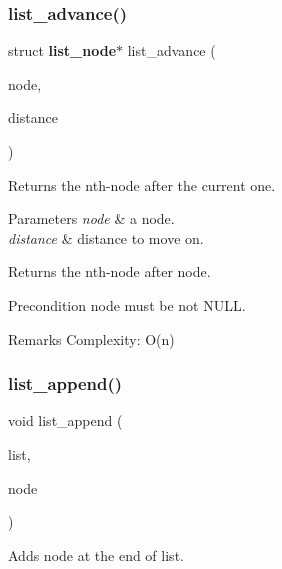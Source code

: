 \subsubsection{list\+\_\+advance()}
{\footnotesize\ttfamily struct \textbf{ list\+\_\+node}$\ast$ list\+\_\+advance (\begin{DoxyParamCaption}\item[{struct \textbf{ list\+\_\+node} $\ast$}]{node,  }\item[{size\+\_\+t}]{distance }\end{DoxyParamCaption})}

Returns the nth-\/node after the current one.


\begin{DoxyParams}{Parameters}
{\em node} & a node. \\
\hline
{\em distance} & distance to move on. \\
\hline
\end{DoxyParams}
\begin{DoxyReturn}{Returns}
the nth-\/node after {\ttfamily node}.
\end{DoxyReturn}
\begin{DoxyPrecond}{Precondition}
{\ttfamily node} must be not N\+U\+LL.
\end{DoxyPrecond}
\begin{DoxyRemark}{Remarks}
Complexity\+: O(n) 
\end{DoxyRemark}
\mbox{\label{list_8c_a40638777b5f341c88e8b09acf75fb8c9}} 
\subsubsection{list\+\_\+append()}
{\footnotesize\ttfamily void list\+\_\+append (\begin{DoxyParamCaption}\item[{struct \textbf{ list} $\ast$}]{list,  }\item[{struct \textbf{ list\+\_\+node} $\ast$}]{node }\end{DoxyParamCaption})\hspace{0.3cm}{\ttfamily [inline]}}

Adds {\ttfamily node} at the end of {\ttfamily list}.


